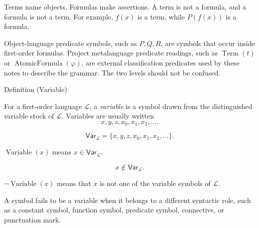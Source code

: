 \begin{remark*}
Terms name objects. Formulas make assertions. A term is not a formula, and a
formula is not a term. For example, \(f(x)\) is a term, while \(P(f(x))\) is a
formula.
\end{remark*}

\begin{remark*}
Object-language predicate symbols, such as \(P,Q,R\), are symbols that occur
inside first-order formulas. Project metalanguage predicate readings, such as
\(\operatorname{Term}(t)\) or \(\operatorname{AtomicFormula}(\varphi)\), are
external classification predicates used by these notes to describe the grammar.
The two levels should not be confused.
\end{remark*}

\begin{definitionbox}{Definition (Variable)}
\begin{definition}[Variable]
\label{def:variable}
For a first-order language \(\mathcal L\), a \emph{variable} is a symbol drawn
from the distinguished variable stock of \(\mathcal L\). Variables are usually
written
\[
x,y,z,x_0,x_1,x_2,\ldots .
\]
\end{definition}
\end{definitionbox}

\begin{remark*}
\[
\mathsf{Var}_{\mathcal L}=\{x,y,z,x_0,x_1,x_2,\ldots\}.
\]
\end{remark*}

\begin{remark*}
\(\operatorname{Variable}(x)\) means \(x\in\mathsf{Var}_{\mathcal L}\).
\end{remark*}

\begin{remark*}
\[
x\notin\mathsf{Var}_{\mathcal L}.
\]
\end{remark*}

\begin{remark*}
\(\neg\operatorname{Variable}(x)\) means that \(x\) is not one of the variable
symbols of \(\mathcal L\).
\end{remark*}

\begin{remark*}
A symbol fails to be a variable when it belongs to a different syntactic role,
such as a constant symbol, function symbol, predicate symbol, connective, or
punctuation mark.
\end{remark*}

